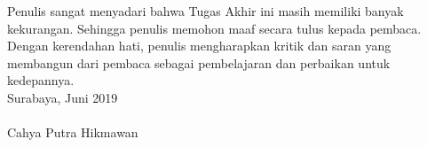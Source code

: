 		
		\indent Penulis sangat menyadari bahwa Tugas Akhir ini masih memiliki banyak kekurangan. Sehingga penulis memohon maaf secara tulus kepada pembaca. Dengan kerendahan hati, penulis mengharapkan kritik dan saran yang membangun dari pembaca sebagai pembelajaran dan perbaikan untuk kedepannya. \\

		\hfill Surabaya, Juni 2019 \\ \\
		
		\hfill Cahya Putra Hikmawan